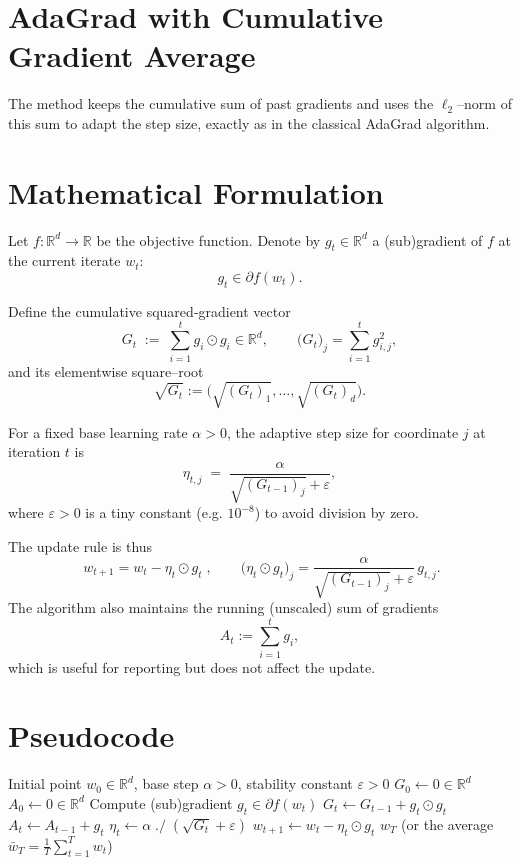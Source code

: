 \documentclass{article}
\begin{document}
\section*{AdaGrad with Cumulative Gradient Average}
The method keeps the cumulative sum of past gradients and uses the
$\ell_2$–norm of this sum to adapt the step size, exactly as in the
classical AdaGrad algorithm.

\section*{Mathematical Formulation}
Let $f:\mathbb{R}^d\to\mathbb{R}$ be the objective function.
Denote by $g_t\in\mathbb{R}^d$ a (sub)gradient of $f$ at the current iterate
$w_t$:
\[
g_t\in\partial f(w_t).
\]

Define the cumulative squared‐gradient vector
\[
G_t \;:=\;\sum_{i=1}^{t} g_i\odot g_i\in\mathbb{R}^d,
\qquad 
\bigl(G_t\bigr)_j=\sum_{i=1}^{t} g_{i,j}^2,
\]
and its elementwise square–root
\[
\sqrt{G_t}:=\bigl(\sqrt{(G_t)_1},\ldots,\sqrt{(G_t)_d}\bigr).
\]

For a fixed base learning rate $\alpha>0$, the adaptive step size for
coordinate $j$ at iteration $t$ is
\[
\eta_{t,j}\;=\;\frac{\alpha}{\sqrt{(G_{t-1})_j}+ \varepsilon},
\]
where $\varepsilon>0$ is a tiny constant (e.g. $10^{-8}$) to avoid division
by zero.

The update rule is thus
\[
\boxed{\;w_{t+1}=w_t-\eta_t\odot g_t\;},\qquad 
\bigl(\eta_t\odot g_t\bigr)_j=\frac{\alpha}{\sqrt{(G_{t-1})_j}+ \varepsilon}\,g_{t,j}.
\]
The algorithm also maintains the running (unscaled) sum of gradients
\[
A_t:=\sum_{i=1}^{t} g_i,
\]
which is useful for reporting but does not affect the update.

\section*{Pseudocode}
\begin{algorithm}[H]
\caption{AdaGrad with Cumulative Gradient Average}
\begin{algorithmic}[1]
\Require Initial point $w_0\in\mathbb{R}^d$, base step $\alpha>0$, 
        stability constant $\varepsilon>0$
\State $G_0\gets 0\in\mathbb{R}^d$ 
\State $A_0\gets 0\in\mathbb{R}^d$ 
    \State Compute (sub)gradient $g_t\in\partial f(w_t)$
    \State $G_t \gets G_{t-1}+ g_t\odot g_t$ 
    \State $A_t \gets A_{t-1}+ g_t$ 
    \State $\eta_t \gets \alpha\;./\;(\sqrt{G_{t}}+\varepsilon)$ 
    \State $w_{t+1} \gets w_t - \eta_t\odot g_t$
\EndFor
\State \Return $w_T$ (or the average $\bar w_T=\frac1T\sum_{t=1}^T w_t$)
\end{algorithmic}
\end{algorithm}
\end{document}
